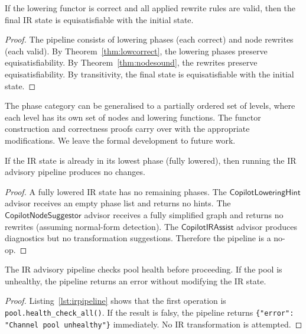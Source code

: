 \documentclass[11pt]{article}
\newcommand{\LowHint}{\mathsf{CopilotLoweringHint}}
\newcommand{\NodeSugg}{\mathsf{CopilotNodeSuggestor}}
\newcommand{\IRAssist}{\mathsf{CopilotIRAssist}}
\begin{document}
\begin{proposition}%
\label{prop:fullpipecorrect}
If the lowering functor is correct and all applied rewrite
rules are valid, then the final IR state is equisatisfiable
with the initial state.
\end{proposition}
\begin{proof}
The pipeline consists of lowering phases (each correct)
and node rewrites (each valid).  By Theorem~\ref{thm:lowcorrect},
the lowering phases preserve equisatisfiability.  By
Theorem~\ref{thm:nodesound}, the rewrites preserve
equisatisfiability.  By transitivity, the final state
is equisatisfiable with the initial state.
\end{proof}

\begin{remark}
The phase category can be generalised to a partially
ordered set of levels, where each level has its own set
of nodes and lowering functions.  The functor construction
and correctness proofs carry over with the appropriate
modifications.  We leave the formal development to future work.
\end{remark}

\begin{lemma}%
\label{lem:irpipeidempotent}
If the IR state is already in its lowest phase (fully lowered),
then running the IR advisory pipeline produces no changes.
\end{lemma}
\begin{proof}
A fully lowered IR state has no remaining phases.  The
$\LowHint$ advisor receives an empty phase list and returns
no hints.  The $\NodeSugg$ advisor receives a fully simplified
graph and returns no rewrites (assuming normal-form detection).
The $\IRAssist$ advisor produces diagnostics but no transformation
suggestions.  Therefore the pipeline is a no-op.
\end{proof}

\begin{lemma}%
\label{lem:pipehealthpre}
The IR advisory pipeline checks pool health before proceeding.
If the pool is unhealthy, the pipeline returns an error without
modifying the IR state.
\end{lemma}
\begin{proof}
Listing~\ref{lst:irpipeline} shows that the first operation is
\texttt{pool.health\_check\_all()}.  If the result is falsy,
the pipeline returns \texttt{\{"error": "Channel pool unhealthy"\}}
immediately.  No IR transformation is attempted.
\end{proof}
\end{document}
